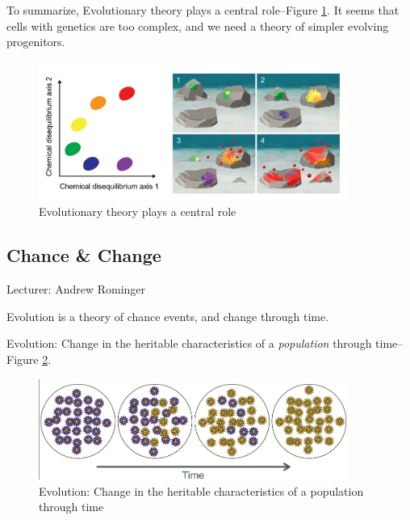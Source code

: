 \documentclass[]{article}
\begin{document}
To summarize, Evolutionary theory plays a central role--Figure \ref{fig:Baum2018a}\cite{baum2018origin}. It seems that cells with genetics are too complex, and we need a theory of simpler evolving progenitors.

\begin{figure}[H]
	\caption{Evolutionary theory plays a central role}\label{fig:Baum2018a}
	\includegraphics[width=0.9\textwidth]{Baum2018a}
\end{figure}


\subsection{Chance \& Change}

Lecturer: Andrew Rominger

Evolution is a theory of chance events, and change through time.

Evolution: Change in the heritable characteristics of
a \textit{population} through time--Figure \ref{fig:ChangeThroughTime}.
\begin{figure}[H]
	\caption{Evolution: Change in the heritable characteristics of
		a population through time}\label{fig:ChangeThroughTime}
	\includegraphics[width=0.9\textwidth]{ChangeThroughTime}
\end{figure}
\end{document}
